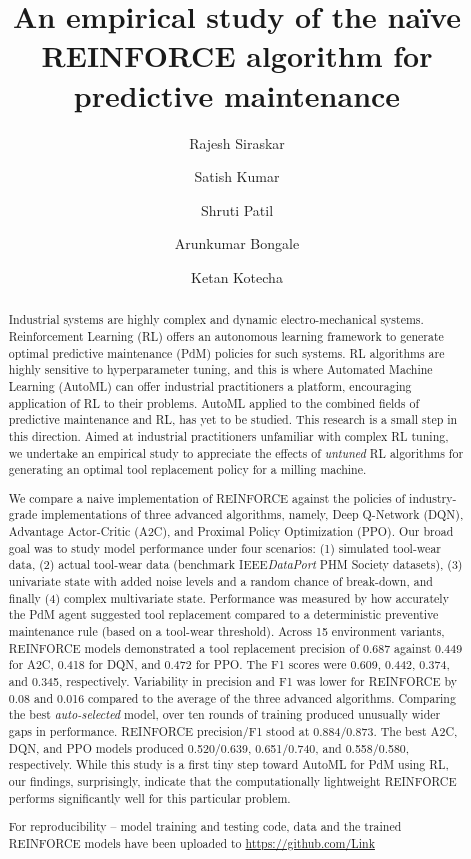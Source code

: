 \documentclass[a4paper, 12pt]{article}
\title{An empirical study of the na\"ive REINFORCE algorithm for predictive maintenance}
\author[1,3]{Rajesh Siraskar} %
\author[1,2]{Satish Kumar} %
\author[1,2]{Shruti Patil}
\author[1]{Arunkumar Bongale}
\author[1,2]{Ketan Kotecha}
\affil[1]{Symbiosis Institute of Technology, Symbiosis International (Deemed University), Pune, 412115, Maharashtra, India}
\affil[2]{Symbiosis Centre for Applied Artificial Intelligence, Symbiosis International (Deemed University), Pune, 412115, Maharashtra, India}
\affil[3]{Birlasoft Ltd., Pune, 411057, Maharashtra, India}
\date{\Version}
\begin{document}
\maketitle
\begin{abstract}
Industrial systems are highly complex and dynamic electro-mechanical systems. Reinforcement Learning (RL) offers an autonomous learning framework to generate optimal predictive maintenance (PdM) policies for such systems. RL algorithms are highly sensitive to hyperparameter tuning, and this is where Automated Machine Learning (AutoML) can offer industrial practitioners a platform, encouraging application of RL to their problems. AutoML applied to the combined fields of predictive maintenance and RL, has yet to be studied. This research is a small step in this direction. Aimed at industrial practitioners unfamiliar with complex RL tuning, we undertake an empirical study to appreciate the effects of \textit{untuned} RL algorithms for generating an optimal tool replacement policy for a milling machine. 

We compare a naive implementation of REINFORCE against the policies of industry-grade implementations of three advanced algorithms, namely, Deep Q-Network (DQN), Advantage Actor-Critic (A2C), and Proximal Policy Optimization (PPO). Our broad goal was to study model performance under four scenarios: (1) simulated tool-wear data, (2) actual tool-wear data (benchmark IEEE\textit{DataPort} PHM Society datasets), (3) univariate state with added noise levels and a random chance of break-down, and finally (4) complex multivariate state. Performance was measured by how accurately the PdM agent suggested tool replacement compared to a deterministic preventive maintenance rule (based on a tool-wear threshold). Across 15 environment variants, REINFORCE models demonstrated a tool replacement precision of 0.687 against 0.449 for A2C, 0.418 for DQN, and 0.472 for PPO. The F1 scores were 0.609, 0.442, 0.374, and 0.345, respectively. Variability in precision and F1 was lower for REINFORCE by 0.08 and 0.016 compared to the average of the three advanced algorithms. Comparing the best \textit{auto-selected} model, over ten rounds of training produced unusually wider gaps in performance. REINFORCE precision/F1 stood at 0.884/0.873. The best A2C, DQN, and PPO models produced 0.520/0.639, 0.651/0.740, and 0.558/0.580, respectively. While this study is a first tiny step toward AutoML for PdM using RL, our findings, surprisingly, indicate that the computationally lightweight REINFORCE performs significantly well for this particular problem.

For reproducibility -- model training and testing code, data and the trained REINFORCE models have been uploaded to \href{https://github.com/Rajesh-Siraskar/Empirical-Study\_REINFORCE-for-predictive-maintenance}{https://github.com/Link} 
\end{abstract}
\end{document}
